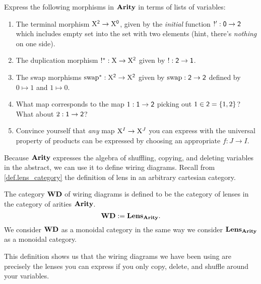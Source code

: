 \documentclass[DynamicalBook]{subfiles}
\begin{document}
\begin{exercise}
  Express the following morphisms in $\textbf{Arity}$ in terms of lists of variables:
  \begin{enumerate}
    \item The terminal morphism $\mathrm{X}^{\mathsf{2}} \to \mathrm{X}^{\mathsf{0}}$, given by the
      \emph{initial} function $!' : \mathsf{0} \to \mathsf{2}$ which includes empty
      set into the set with two elements (hint, there's \emph{nothing} on one side).
    \item The duplication morphism $!^{\ast} : \mathrm{X} \to \mathrm{X}^{\mathsf{2}}$ given by
      $! : \mathsf{2} \to \mathsf{1}$. 
    \item The swap morphisms $\mathrm{swap}^{\ast} : \mathrm{X}^{\mathsf{2}} \to
      \mathrm{X}^{\mathsf{2}}$ given by $\mathrm{swap} : \mathsf{2} \to \mathsf{2}$ defined by $0
      \mapsto 1$ and $1 \mapsto 0$.
    \item What map corresponds to the map $1 : \mathsf{1} \to \mathsf{2}$ picking out
      $1 \in \mathsf{2} = \{1, 2\}$? What about $2 : \mathsf{1} \to \mathsf{2}$? 
    \item Convince yourself that \emph{any} map $\mathrm{X}^I \to \mathrm{X}^J$ you can express with the
      universal property of products can be expressed by choosing an appropriate
      $f : J \to I$.
  \end{enumerate}
\end{exercise}

Because $\textbf{Arity}$ expresses the algebra of shuffling, copying, and deleting
variables in the abstract, we can use it to define wiring diagrams. Recall from \cref{def.lens_category} the definition of lens in an arbitrary cartesian category.

\begin{definition}\label{def.category_of_wiring_diagrams}
  The category $\textbf{WD}$ of wiring diagrams is defined to be the category of
  lenses in the category of arities $\textbf{Arity}$.
  $$\textbf{WD} := \textbf{Lens}_{\textbf{Arity}}.$$
We consider $\textbf{WD}$ as a monoidal category in the same way we consider
$\textbf{Lens}_{\textbf{Arity}}$ as a monoidal category.
\end{definition}

This definition shows us that the wiring diagrams we have been using are
precisely the lenses you can express if you only copy, delete, and shuffle
around your variables.
\end{document}
